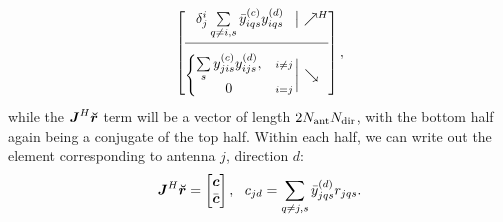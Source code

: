 \documentclass[useAMS,usenatbib]{mn2e}
\makeatletter
\newcommand{\mat}[1]{{\bmath{#1}}}
\newcommand{\JJ}{\mat{J}} %
\newcommand{\MM}{\mat{M}}
\newcommand{\VV}{\mat{V}}
\newcommand{\GG}{\mat{G}}
\newcommand{\Matrix}[2]{\left [ \begin{array}{@{}#1@{}}#2\end{array} \right ]}
\newcommand{\AUGx}[1]{\mathbf{\breve{#1}}}
\newcommand{\AUG}[1]{\bmath{\breve{#1}}}
\newcommand{\Rr}{\AUG{r}}
\newcommand{\GGg}{\AUGx{G}}
\newcommand{\TOP}{\mathrm{U}}%
\newcommand{\Rop}[1]{\mathcal{R}_{{#1}}}
\newcommand{\Lop}[1]{\mathcal{L}_{{#1}}}
\numberwithin{equation}{section}
\makeatother
\begin{document}
\begin{equation}%
\JHJblocks{
  \delta^i_j \sum\limits_{q\ne i,s} \yycH_{iqs} \yyd_{iqs} 
}{
  \left \{ 
  \begin{array}{@{}cc@{}}
   \sum\limits_{s} \yyc_{jis} \yyd_{ijs},&{\scriptstyle i\ne j} \\
   0 &{\scriptstyle i=j}
  \end{array} \right . 
},
\label{eq:JHJ:DD:unpol}
\end{equation}
while the $\JJ^H\Rr$ term will be a vector of length $2N_\mathrm{ant}N_\mathrm{dir}$, with the bottom half again being
a conjugate of the top half. Within each half, we can write out the element corresponding to 
antenna $j$, direction $d$: 
\begin{equation}
\label{eq:JHR:DD:unpol}
\JJ^H\Rr = \Matrix{c}{\bmath{c}\\\bar{\bmath{c}}},~~c_{jd} = \sum\limits_{q\ne j,s} 
\yydH_{jqs} r_{jqs}.
\end{equation}
\end{document}
